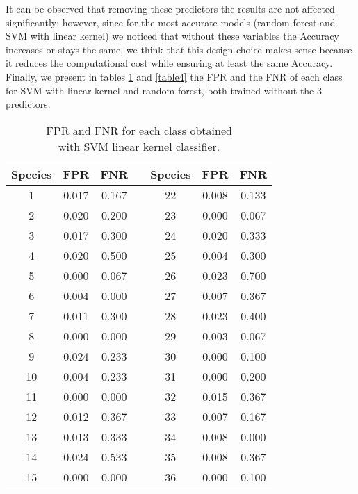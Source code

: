 \documentclass{article}
\begin{document}
It can be observed that removing these predictors the results are not affected significantly; however, since for the most accurate models (random forest and SVM with linear kernel) we noticed that without these variables the Accuracy increases or stays the same, we think that this design choice makes sense because it reduces the computational cost while ensuring at least the same Accuracy.
\\Finally, we present in tables \ref{table3} and \ref{table4} the FPR and the FNR of each class for SVM with linear kernel and random forest, both trained without the $3$ predictors. 

\begin{table}[h]\footnotesize
\begin{minipage}[]{7cm}
 \begin{adjustwidth}{-3cm}{}
\begin{tabular}{|c|c|c|c|c|c|c| } \hline
Species & FPR & FNR & & Species & FPR & FNR \\
\hline
1 & 0.017 & 0.167 & & 22 & 0.008 & 0.133 \\ 
\hline
2 & 0.020 & 0.200 & & 23 & 0.000 & 0.067 \\ 
\hline
 3 & 0.017 & 0.300 & & 24 & 0.020 & 0.333\\ 
\hline
 4 & 0.020 & 0.500 & & 25 & 0.004 & 0.300 \\ 
\hline
 5 & 0.000 & 0.067 & & 26 & 0.023 & 0.700 \\ 
\hline
 6 & 0.004 & 0.000 & & 27 & 0.007 & 0.367 \\ 
\hline
 7 & 0.011 & 0.300 & & 28 & 0.023 & 0.400 \\ 
\hline
 8 & 0.000 & 0.000 & & 29 & 0.003 & 0.067 \\ 
\hline
 9 & 0.024 & 0.233 & & 30 & 0.000 & 0.100  \\ 
\hline
 10 & 0.004 & 0.233 & & 31 &  0.000 & 0.200 \\ 
\hline
 11 & 0.000 & 0.000 & & 32 & 0.015 & 0.367 \\ 
\hline
 12 & 0.012 & 0.367 & & 33 & 0.007 & 0.167\\ 
\hline
 13 & 0.013 & 0.333 & & 34 & 0.008 & 0.000\\ 
\hline
 14 & 0.024 & 0.533 & & 35 & 0.008 & 0.367\\ 
\hline
 15 & 0.000 & 0.000 & & 36 & 0.000 & 0.100\\  
\hline
\end{tabular}
\caption{FPR and FNR for each class obtained \\ with SVM linear kernel classifier.}\label{table3}

\end{adjustwidth}
\end{minipage}
\end{table}
\end{document}
